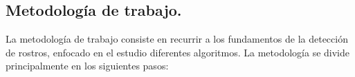 \documentclass[letterpaper,12pt]{article}
\begin{document}
%




\newpage
\subsection{Metodología de trabajo.}

La metodología de trabajo consiste en recurrir a los fundamentos de la detección de rostros, enfocado en el estudio diferentes algoritmos. La metodología se divide principalmente en los siguientes pasos:
\end{document}
